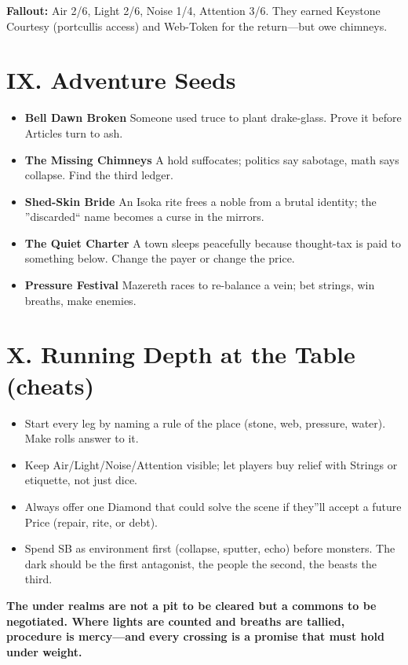 \documentclass[11pt]{article}
\begin{document}
\textbf{Fallout:} Air 2/6, Light 2/6, Noise 1/4, Attention 3/6. They earned Keystone Courtesy (portcullis access) and Web-Token for the return---but owe chimneys.

\section{IX. Adventure Seeds}
\begin{itemize}
    \item \textbf{Bell Dawn Broken} Someone used truce to plant drake-glass. Prove it before Articles turn to ash.
    \item \textbf{The Missing Chimneys} A hold suffocates; politics say sabotage, math says collapse. Find the third ledger.
    \item \textbf{Shed-Skin Bride} An Isoka rite frees a noble from a brutal identity; the ''discarded`` name becomes a curse in the mirrors.
    \item \textbf{The Quiet Charter} A town sleeps peacefully because thought-tax is paid to something below. Change the payer or change the price.
    \item \textbf{Pressure Festival} Mazereth races to re-balance a vein; bet strings, win breaths, make enemies.
\end{itemize}

\section{X. Running Depth at the Table (cheats)}
\begin{itemize}
    \item Start every leg by naming a rule of the place (stone, web, pressure, water). Make rolls answer to it.
    \item Keep Air/Light/Noise/Attention visible; let players buy relief with Strings or etiquette, not just dice.
    \item Always offer one Diamond that could solve the scene if they''ll accept a future Price (repair, rite, or debt).
    \item Spend SB as environment first (collapse, sputter, echo) before monsters. The dark should be the first antagonist, the people the second, the beasts the third.
\end{itemize}

\textbf{The under realms are not a pit to be cleared but a commons to be negotiated. Where lights are counted and breaths are tallied, procedure is mercy---and every crossing is a promise that must hold under weight.}
\end{document}
